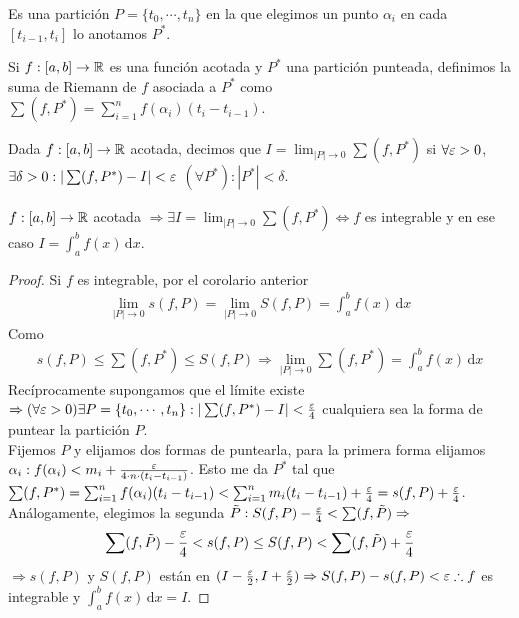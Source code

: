\begin{definition}
  Es una partición \(P = \{t_0, \cdots, t_n\}\) en la que elegimos un punto \(\alpha_i\) en cada \([t_{i-1}, t_i]\) lo anotamos \(P^*\).
\end{definition}

\begin{definition}
  Si \(f: [a,b] \to \mathbb{R}\) es una función acotada y \(P^*\) una partición punteada, definimos la suma de Riemann de \(f\) asociada a \(P^*\) como \(\sum (f, P^*) = \sum_{i = 1}^n f(\alpha_i) (t_i - t_{i-1})\).
\end{definition}

\begin{definition}
  Dada \(f: [a, b] \to \mathbb{R}\) acotada, decimos que \(I = \lim_{|P| \to 0} \sum (f, P^*)\) si \(\forall \varepsilon > 0\), \(\exists \delta > 0 : | \sum (f, P^*) - I| < \varepsilon\) \((\forall P^*) : |P^*| < \delta\).
\end{definition}

\begin{theorem}
  \(f: [a, b] \to \mathbb{R}\) acotada \(\Rightarrow \exists I = \lim_{|P| \to 0} \sum (f, P^*) \iff f\) es integrable y en ese caso \(I = \int_a^b f(x) \, \mathrm{d}x\).
  \begin{proof}
    Si \(f\) es integrable, por el corolario anterior \begin{align*}
      \lim_{|P| \to 0} s(f, P) = \lim_{|P| \to 0} S(f, P) = \int_a^b f(x) \, \mathrm{d}x
    \end{align*}
    Como \begin{align*}s(f, P) \leq \sum(f, P^*) \leq S(f, P) \Rightarrow \lim_{|P| \to 0} \sum(f, P^*) = \int_a^b f(x) \, \mathrm{d}x \end{align*}
    Recíprocamente supongamos que el límite existe \(\Rightarrow (\forall \varepsilon > 0) \exists P = \{ t_0, \cdots, t_n \} : |\sum (f, P^*) - I| < \frac{\varepsilon}{4}\) cualquiera sea la forma de puntear la partición \(P\). \\
    Fijemos \(P\) y elijamos dos formas de puntearla, para la primera forma elijamos \(\alpha_i : f(\alpha_i) < m_i + \frac{\varepsilon}{4 \cdot n \cdot (t_i - t_{i-1})}\). Esto me da \(P^*\) tal que \(\sum (f, P^*) = \sum_{i = 1}^n f(\alpha_i) (t_i - t_{i-1}) < \sum_{i = 1}^n m_i (t_i - t_{i-1}) + \frac{\varepsilon}{4} = s(f, P) + \frac{\varepsilon}{4}\). \\
    Análogamente, elegimos la segunda \(\tilde{P} : S(f, P) - \frac{\varepsilon}{4} < \sum (f, \tilde{P}) \Rightarrow\)
    \begin{align*}
      \sum (f, \tilde{P}) - \frac{\varepsilon}{4} < s(f, P) \leq S(f, P) < \sum (f, \tilde{P}) + \frac{\varepsilon}{4}
    \end{align*}
    \(\Rightarrow s(f, P)\) y \(S(f, P)\) están en \((I - \frac{\varepsilon}{2}, I + \frac{\varepsilon}{2}) \Rightarrow S(f, P)- s(f, P) < \varepsilon \therefore f\) es integrable y \(\int_a^b f(x) \, \mathrm{d}x = I\).
  \end{proof}
\end{theorem}

